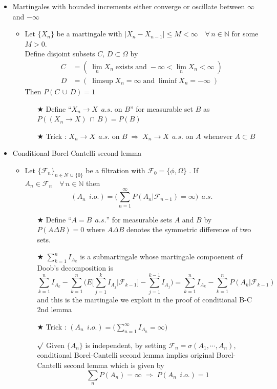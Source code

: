 \documentclass[12pt, A4]{article}
\newcommand{\rmk}{$\surd$}
\newcommand{\trick}{$\bigstar$}
\newcommand{\N}{\mathbb{N}}
\newcommand{\F}{\mathcal{F}}
\newcommand{\union}{\,\cup\,}
\newcommand{\intersect}{\,\cap\,}
\newcommand{\foranyn}{\quad \forall \, n\in \N}
\begin{document}
\begin{itemize}
\begin{itemize}
	\end{itemize}
	\item Martingales with bounded increments either converge or oscillate between $\infty$ and $-\infty$
	\begin{itemize}
		\item Let $\{X_n\}$ be a martingale with $|X_n-X_{n-1}|\leq M<\infty\foranyn$ for some $M>0$. \\Define disjoint subsets $C,\,D\subset \Omega$ by 
		\begin{align*}
			C&=(\;\lim_n X_n\; \text{exists and}\; -\infty<\lim_nX_n<\infty \;)\\
			D&=(\;\limsup X_n=\infty \;\text{and}\; \liminf X_n=-\infty \;)
		\end{align*}
		Then $P(C\union D)=1$
		\begin{itemize}
			\item[\trick] Define ``$X_n\rightarrow X\;\,a.s.$ on $B$'' for measurable set $B$ as $P((X_n\rightarrow X)\intersect B)=P(B)$ 
			\item[\trick] Trick : $X_n\rightarrow X\;\,a.s.$ on $B\;\Rightarrow\; X_n\rightarrow X\;\,a.s.$ on $A$ whenever $A\subset B$ 
		\end{itemize}
	\end{itemize}
	\item Conditional Borel-Cantelli second lemma
	\begin{itemize}
		\item Let $\{\F_n\}_{n\in N\union \{0\}}$ be a filtration with $\F_0=\{\phi, \Omega\}$ . If $A_n\in \F_n\foranyn$ then $$(A_n\;\,i.o.)=\Big(\sum_{n=1}^\infty P(A_n|\F_{n-1})=\infty\Big)\;\,a.s. $$
		\begin{itemize}
			\item[\trick] Define ``$A=B\;\,a.s.$'' for measurable sets $A$ and $B$ by $P(A\Delta B)=0$ where $A\Delta B$ denotes the symmetric difference of two sets.
			\item[\trick] $\sum_{k=1}^n I_{A_k}$ is a submartingale whose martingale compoenent of Doob's decomposition is $$\sum_{k=1}^n I_{A_k}-\sum_{k=1}^n\Big( E\Big[\sum_{j=1}^k I_{A_j}|\F_{k-1}\Big]-\sum_{j=1}^{k-1}I_{A_{j}}\Big)=\sum_{k=1}^n I_{A_k}-\sum_{k=1}^nP(A_k|\F_{k-1})$$ and this is the martingale we exploit in the proof of conditional B-C 2nd lemma 
			\item[\trick] Trick : $(A_n\;\,i.o.)=\big(\sum_{n=1}^\infty I_{A_n}=\infty \big)$
			\item[\rmk] Given $\{A_n\}$ is independent, by setting $\F_n=\sigma(A_1, \cdots, A_n)$, conditional Borel-Cantelli second lemma implies original Borel-Cantelli second lemma which is given by $$\sum_n P(A_n)=\infty \;\Rightarrow \;P(A_n\;\, i.o.)=1 $$   

\end{itemize}
\end{itemize}
\end{itemize}
\end{document}
